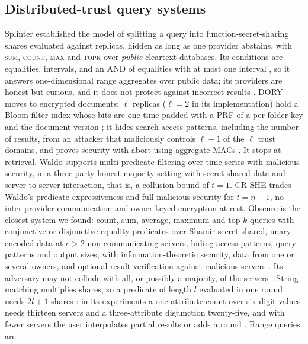 \documentclass[a4paper,fleqn]{cas-sc}
\begin{document}
\subsection{Distributed-trust query systems}
Splinter \citep{splinter} established the model of splitting a query into
function-secret-sharing shares evaluated against replicas, hidden as long as
one provider abstains, with \textsc{sum}, \textsc{count}, \textsc{max} and
\textsc{topk} over \emph{public} cleartext databases. Its conditions are
equalities, intervals, and an AND of equalities with at most one interval
\citep[Fig.~4]{splinter}, so it answers one-dimensional range aggregates over
public data; its providers are honest-but-curious, and it does not protect
against incorrect results \citep[\S2.3]{splinter}. DORY \citep{dory} moves to
encrypted documents: $\ell$ replicas ($\ell=2$ in its implementation) hold a
Bloom-filter index whose bits are one-time-padded with a PRF of a per-folder
key and the document version \citep[\S4.1]{dory}; it hides search access
patterns, including the number of results, from an attacker that maliciously
controls $\ell-1$ of the $\ell$ trust domains, and proves security with abort
using aggregate MACs \citep[\S3.4, \S4.3]{dory}. It stops at retrieval. Waldo \citep{waldo} supports multi-predicate filtering over
time series with malicious security, in a three-party honest-majority setting
with secret-shared data and server-to-server interaction, that is, a
collusion bound of $t=1$. CR-SHE trades Waldo's predicate expressiveness and
full malicious security for $t=n-1$, no inter-provider communication and
owner-keyed encryption at rest. Obscure \citep{gupta2019obscure,gupta2020obscure}
is the closest system we found: count, sum, average, maximum and top-$k$
queries with conjunctive or disjunctive equality predicates over Shamir
secret-shared, unary-encoded data at $c>2$ non-communicating servers, hiding
access patterns, query patterns and output sizes, with information-theoretic
security, data from one or several owners, and optional result verification
against malicious servers \citep[\S1, \S3]{gupta2020obscure}. Its adversary
may not collude with all, or possibly a majority, of the servers
\citep[\S3.2]{gupta2020obscure}. String matching multiplies shares, so a
predicate of length $l$ evaluated in one round needs $2l+1$ shares
\citep[\S2.1, Table~7]{gupta2020obscure}: in its experiments a one-attribute
count over six-digit values needs thirteen servers and a three-attribute
disjunction twenty-five, and with fewer servers the user interpolates partial
results or adds a round \citep[App.~E]{gupta2020obscure}. Range queries are
\end{document}
